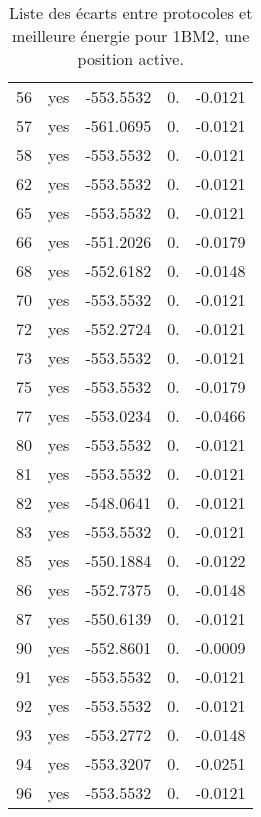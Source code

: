 \begin{table}[h]
\begin{tabular}{ccccc}
        56 & yes &  -553.5532 &  0. & -0.0121 \\
        57 & yes &  -561.0695 &  0. & -0.0121 \\
        58 & yes &  -553.5532 &  0. & -0.0121 \\
        62 & yes &  -553.5532 &  0. & -0.0121 \\
        65 & yes &  -553.5532 &  0. & -0.0121 \\
        66 & yes &  -551.2026 &  0. & -0.0179 \\
        68 & yes &  -552.6182 &  0. & -0.0148 \\
        70 & yes &  -553.5532 &  0. & -0.0121 \\
        72 & yes &  -552.2724 &  0. & -0.0121 \\
        73 & yes &  -553.5532 &  0. & -0.0121 \\
        75 & yes &  -553.5532 &  0. & -0.0179 \\
        77 & yes &  -553.0234 &  0. & -0.0466 \\
        80 & yes &  -553.5532 &  0. & -0.0121 \\
        81 & yes &  -553.5532 &  0. & -0.0121 \\
        82 & yes &  -548.0641 &  0. & -0.0121 \\
        83 & yes &  -553.5532 &  0. & -0.0121 \\
        85 & yes &  -550.1884 &  0. & -0.0122 \\
        86 & yes &  -552.7375 &  0. & -0.0148 \\
        87 & yes &  -550.6139 &  0. & -0.0121 \\
        90 & yes &  -552.8601 &  0. & -0.0009 \\
        91 & yes &  -553.5532 &  0. & -0.0121 \\
        92 & yes &  -553.5532 &  0. & -0.0121 \\
        93 & yes &  -553.2772 &  0. & -0.0148 \\
        94 & yes &  -553.3207 &  0. & -0.0251 \\
        96 & yes &  -553.5532 &  0. & -0.0121 \\
        \bottomrule

      \end{tabular}      
      \caption{Liste des écarts entre protocoles et meilleure énergie pour 1BM2, une position active.}
\label{tab:result_1_active_1BM2}      
    \end{table}




